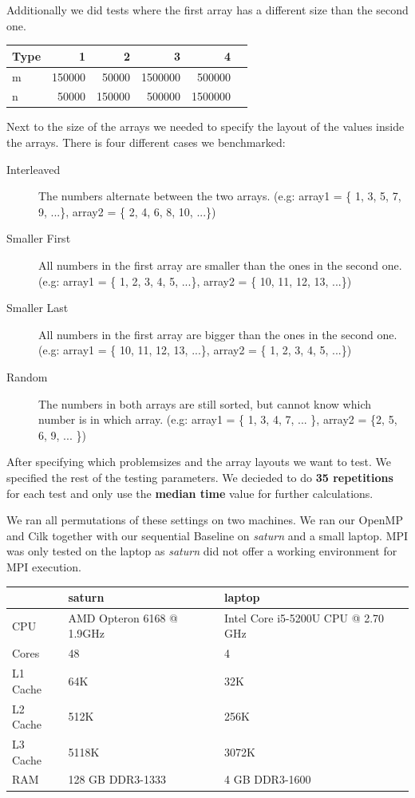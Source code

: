 \documentclass[12pt,a4paper,titlepage,oneside]{scrartcl}
\begin{document}
Additionally we did tests where the first array has a different size than the second one.
\begin{center}
\begin{tabular}{l | r | r | r | r | r}
\hline
 Type & 1 & 2 & 3 & 4 \\ \hline
 m & 150000 & 50000 & 1500000 & 500000 \\ \hline
 n & 50000 & 150000 & 500000 & 1500000 \\ \hline
\end{tabular}
\end{center}

Next to the size of the arrays we needed to specify the layout of the values inside the arrays.
There is four different cases we benchmarked:

\begin{description}
\item[Interleaved] The numbers alternate between the two arrays. (e.g: array1 = \{ 1, 3, 5, 7, 9, ...\}, array2 = \{ 2, 4, 6, 8, 10, ...\})
\item[Smaller First] All numbers in the first array are smaller than the ones in the second one. (e.g: array1 = \{ 1, 2, 3, 4, 5, ...\}, array2 = \{ 10, 11, 12, 13, ...\})
\item[Smaller Last] All numbers in the first array are bigger than the ones in the second one.  (e.g: array1 = \{ 10, 11, 12, 13, ...\}, array2 = \{ 1, 2, 3, 4, 5, ...\})
\item[Random] The numbers in both arrays are still sorted, but cannot know which number is in which array. (e.g: array1 = \{ 1, 3, 4, 7, ... \}, array2 = \{2, 5, 6, 9, ... \})
\end{description}

After specifying which problemsizes and the array layouts we want to test. We specified the rest of the testing parameters. We decieded to do \textbf{35 repetitions} for each test and only use the \textbf{median time} value for further calculations.

We ran all permutations of these settings on two machines. We ran our OpenMP and Cilk together with our sequential Baseline on \textit{saturn} and a small laptop. MPI was only tested on the laptop as \textit{saturn} did not offer a working environment for MPI execution.

\begin{center}
\begin{tabular}{ l | l | l }
\hline
 & saturn & laptop \\ \hline
CPU & AMD Opteron 6168 @ 1.9GHz & Intel Core i5-5200U CPU @ 2.70 GHz \\ \hline
Cores & 48 & 4 \\ \hline
L1 Cache & 64K & 32K \\ \hline
L2 Cache & 512K & 256K \\ \hline
L3 Cache & 5118K & 3072K \\ \hline
RAM & 128 GB DDR3-1333 & 4 GB DDR3-1600 \\ \hline
\end{tabular}
\end{center}
\end{document}
